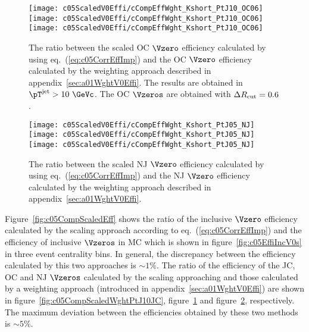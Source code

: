 \begin{figure}[htb]
\begin{center}
\texttt{[image: c05ScaledV0Effi/cCompEffWght\_Kshort\_PtJ10\_OC06]}
\texttt{[image: c05ScaledV0Effi/cCompEffWght\_Kshort\_PtJ10\_OC06]}
\texttt{[image: c05ScaledV0Effi/cCompEffWght\_Kshort\_PtJ10\_OC06]}
\caption{The ratio between the scaled OC $\Vzero$ efficiency calculated by
         using eq.~(\ref{eq:c05CorrEffImp}) and the OC $\Vzero$ efficiency
         calculated by the weighting approach described in
         appendix~\ref{sec:a01WghtV0Effi}.
         The results are obtained in $\pT^{\rm jet}>10~\GeVc$.
         The OC $\Vzeros$ are obtained with $\Delta R_{\rm cut}=0.6$.}
\label{fig:c05CompScaledWghtPtJ10OC06}
\end{center}
\end{figure}

\begin{figure}[htb]
\begin{center}
\texttt{[image: c05ScaledV0Effi/cCompEffWght\_Kshort\_PtJ05\_NJ]}
\texttt{[image: c05ScaledV0Effi/cCompEffWght\_Kshort\_PtJ05\_NJ]}
\texttt{[image: c05ScaledV0Effi/cCompEffWght\_Kshort\_PtJ05\_NJ]}
\caption{The ratio between the scaled NJ $\Vzero$ efficiency calculated by
         using eq.~(\ref{eq:c05CorrEffImp}) and the NJ $\Vzero$ efficiency
         calculated by the weighting approach described in
         appendix~\ref{sec:a01WghtV0Effi}.}
\label{fig:c05CompScaledWghtPtJ10NJ}
\end{center}
\end{figure}

Figure~\ref{fig:c05CompScaledEff} shows the ratio of the inclusive $\Vzero$
efficiency calculated by the scaling approach according
to eq.~(\ref{eq:c05CorrEffImp}) and the efficiency of
inclusive $\Vzeros$ in MC which is shown in figure~\ref{fig:c05EffiIncV0s}
in three event centrality bins.
In general, the discrepancy between the efficiency calculated by this
two approaches is $\sim 1\%$.
The ratio of the efficiency of the JC, OC and NJ $\Vzeros$ calculated by the
scaling approaching and those calculated by a weighting approach (introduced
in appendix~\ref{sec:a01WghtV0Effi}) are shown in
figure~\ref{fig:c05CompScaledWghtPtJ10JC},
figure~\ref{fig:c05CompScaledWghtPtJ10OC06} and
figure~\ref{fig:c05CompScaledWghtPtJ10NJ}, respectively.
The maximum deviation between the efficiencies obtained by these two methods
is $\sim 5\%$.

